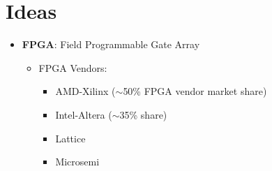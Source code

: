 \documentclass{article}
\begin{document}
\section{Ideas}
    \begin{itemize}[label={\textbullet}, left=0.25cm]
        \item \textbf{FPGA}: Field Programmable Gate Array
        \begin{itemize}[label={--}, left=0.25cm]
            \item FPGA Vendors:
            \begin{itemize}[label={$\cdot$}, left=0.25cm]
                \item AMD-Xilinx ($\sim$50\% FPGA vendor market share)
                \item Intel-Altera ($\sim$35\% share)
                \item Lattice
                \item Microsemi
            \end{itemize}
        \end{itemize}


\end{itemize}
\end{document}
